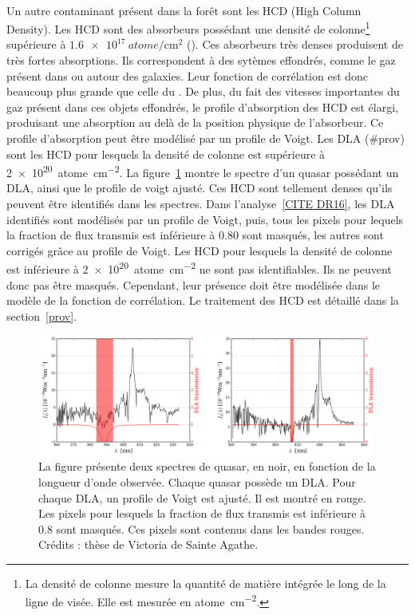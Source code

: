\documentclass[11pt, twoside, a4paper, openright]{report}
\begin{document}
\paragraph{}
Un autre contaminant présent dans la forêt \lya{} sont les HCD (High Column Density). Les HCD sont des absorbeurs possédant une densité de colonne\footnote{La densité de colonne mesure la quantité de matière intégrée le long de la ligne de visée. Elle est mesurée en \si{atome\per\centi\meter\squared}.} supérieure à $\SI{1.6e17}{atome\per\centi\meter\squared}$ (\cite{Rogers2017}). Ces absorbeurs très denses produisent de très fortes absorptions. Ils correspondent à des sytèmes effondrés, comme le gaz présent dans ou autour des galaxies. Leur fonction de corrélation est donc beaucoup plus grande que celle du \lya{}. De plus, du fait des vitesses importantes du gaz présent dans ces objets effondrés, le profile d'absorption des HCD est élargi, produisant une absorption au delà de la position physique de l'absorbeur. Ce profile d'absorption peut être modélisé par un profile de Voigt.
Les DLA (\#prov) sont les HCD pour lesquels la densité de colonne est supérieure à \SI{2e20}{atome\per\centi\meter\squared}.
La figure~\ref{fig:exemple_dla} montre le spectre d'un quasar possédant un DLA, ainsi que le profile de voigt ajusté.
Ces HCD sont tellement denses qu'ils peuvent être identifiés dans les spectres. Dans l'analyse~\ref{CITE DR16}, les DLA identifiés sont modélisés par un profile de Voigt, puis, tous les pixels pour lequels la fraction de flux transmis est inférieure à \num{0.80} sont masqués, les autres sont corrigés grâce au profile de Voigt.
Les HCD pour lesquels la densité de colonne est inférieure à \SI{2e20}{atome\per\centi\meter\squared} ne sont pas identifiables. Ils ne peuvent donc pas être masqués.
Cependant, leur présence doit être modélisée dans le modèle de la fonction de corrélation.
Le traitement des HCD est détaillé dans la section~\ref{prov}.
\begin{figure}
  \centering
  \includegraphics[scale=0.4]{exemple_dla}
  \caption{La figure présente deux spectres de quasar, en noir, en fonction de la longueur d'onde observée. Chaque quasar possède un DLA. Pour chaque DLA, un profile de Voigt est ajusté. Il est montré en rouge. Les pixels pour lesquels la fraction de flux transmis est inférieure à \num{0.8} sont masqués. Ces pixels sont contenus dans les bandes rouges. Crédits : thèse de Victoria de Sainte Agathe.}
  \label{fig:exemple_dla}
\end{figure}




\end{document}
